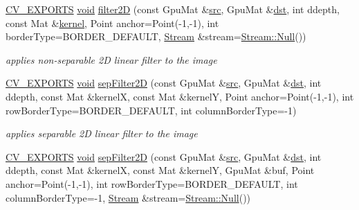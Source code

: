 \begin{DoxyCompactItemize}
\item 
\hyperlink{core_2types__c_8h_a1bf9f0e121b54272da02379cfccd0a2b}{C\-V\-\_\-\-E\-X\-P\-O\-R\-T\-S} \hyperlink{legacy_8hpp_a8bb47f092d473522721002c86c13b94e}{void} \hyperlink{namespacecv_1_1gpu_ad0dd9de5d0cfcd09316f6377d356e689}{filter2\-D} (const Gpu\-Mat \&\hyperlink{legacy_8hpp_a371cd109b74033bc4366f584edd3dacc}{src}, Gpu\-Mat \&\hyperlink{photo__c_8h_aed13e2a25279b24dc954073233fef7a5}{dst}, int ddepth, const Mat \&\hyperlink{imgproc__c_8h_a863a75780ba6c5de552f5361cb0d2c89}{kernel}, Point anchor=Point(-\/1,-\/1), int border\-Type=B\-O\-R\-D\-E\-R\-\_\-\-D\-E\-F\-A\-U\-L\-T, \hyperlink{classcv_1_1gpu_1_1Stream}{Stream} \&stream=\hyperlink{classcv_1_1gpu_1_1Stream_af96c23564834f88333dcb8997df553f1}{Stream\-::\-Null}())
\begin{DoxyCompactList}\small\item\em applies non-\/separable 2\-D linear filter to the image \end{DoxyCompactList}\item 
\hyperlink{core_2types__c_8h_a1bf9f0e121b54272da02379cfccd0a2b}{C\-V\-\_\-\-E\-X\-P\-O\-R\-T\-S} \hyperlink{legacy_8hpp_a8bb47f092d473522721002c86c13b94e}{void} \hyperlink{namespacecv_1_1gpu_a9bd6b91f2fe1800492af254100261fd1}{sep\-Filter2\-D} (const Gpu\-Mat \&\hyperlink{legacy_8hpp_a371cd109b74033bc4366f584edd3dacc}{src}, Gpu\-Mat \&\hyperlink{photo__c_8h_aed13e2a25279b24dc954073233fef7a5}{dst}, int ddepth, const Mat \&kernel\-X, const Mat \&kernel\-Y, Point anchor=Point(-\/1,-\/1), int row\-Border\-Type=B\-O\-R\-D\-E\-R\-\_\-\-D\-E\-F\-A\-U\-L\-T, int column\-Border\-Type=-\/1)
\begin{DoxyCompactList}\small\item\em applies separable 2\-D linear filter to the image \end{DoxyCompactList}\item 
\hyperlink{core_2types__c_8h_a1bf9f0e121b54272da02379cfccd0a2b}{C\-V\-\_\-\-E\-X\-P\-O\-R\-T\-S} \hyperlink{legacy_8hpp_a8bb47f092d473522721002c86c13b94e}{void} \hyperlink{namespacecv_1_1gpu_a5c274cce20178a9aaae84947a72a4a15}{sep\-Filter2\-D} (const Gpu\-Mat \&\hyperlink{legacy_8hpp_a371cd109b74033bc4366f584edd3dacc}{src}, Gpu\-Mat \&\hyperlink{photo__c_8h_aed13e2a25279b24dc954073233fef7a5}{dst}, int ddepth, const Mat \&kernel\-X, const Mat \&kernel\-Y, Gpu\-Mat \&buf, Point anchor=Point(-\/1,-\/1), int row\-Border\-Type=B\-O\-R\-D\-E\-R\-\_\-\-D\-E\-F\-A\-U\-L\-T, int column\-Border\-Type=-\/1, \hyperlink{classcv_1_1gpu_1_1Stream}{Stream} \&stream=\hyperlink{classcv_1_1gpu_1_1Stream_af96c23564834f88333dcb8997df553f1}{Stream\-::\-Null}())

\end{DoxyCompactItemize}
